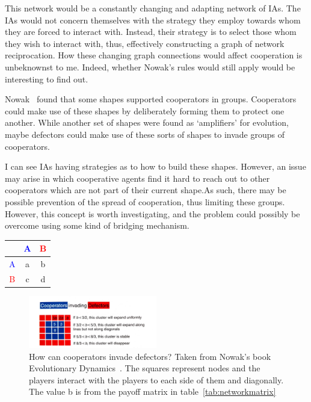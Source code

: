 \documentclass[]{final_report}
\begin{document}
This network would be a constantly changing and adapting network of IAs. The IAs would not concern themselves with the strategy they employ towards whom they are forced to interact with. Instead, their strategy is to select those whom they wish to interact with, thus, effectively constructing a graph of network reciprocation. How these changing graph connections would affect cooperation is unbeknownst to me. Indeed, whether Nowak's rules would still apply would be interesting to find out.\par
Nowak~\cite{nowak2006evolutionary} found that some shapes supported cooperators in groups. Cooperators could make use of these shapes by deliberately forming them to protect one another. While another set of shapes were found as `amplifiers' for evolution, maybe defectors could make use of these sorts of shapes to invade groups of cooperators.\par
I can see IAs having strategies as to how to build these shapes. However, an issue may arise in which cooperative agents find it hard to reach out to other cooperators which are not part of their current shape.As such, there may be possible prevention of the spread of cooperation, thus limiting these groups. However, this concept is worth investigating, and the problem could possibly be overcome using some kind of bridging mechanism.
\begin{framed}
	\begin{center}
		\begin{tabular}{c|cc}
		& \textcolor{blue}{A} & \textcolor{red}{B}\\	
		\hline
		\textcolor{blue}{A} & a & b\\
		\textcolor{red}{B} & c & d\\
		\end{tabular}
		\label{tab:networkmatrix}
	\end{center}	
\end{framed}
\begin{figure}
	\center
	\includegraphics[width=0.5\textwidth]{cooperators-invading-defectors.jpg}
	\caption{How can cooperators invade defectors? Taken from Nowak's book Evolutionary Dynamics~\cite{nowak2006evolutionary}. The squares represent nodes and the players interact with the players to each side of them and diagonally. The value b is from the payoff matrix in table~\ref{tab:networkmatrix}}
	\label{fig:coopinvdef}
\end{figure}
\end{document}
